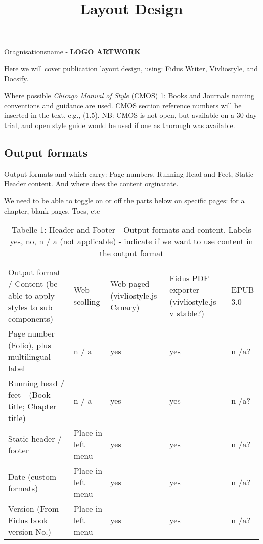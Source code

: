 \documentclass{article}
\begin{document}
\title{Layout Design}

\maketitle


Oragnisationsname - \textbf{LOGO ARTWORK}


Here we will cover publication layout design, using: Fidus Writer, Vivliostyle, and Docsify.


Where possible \emph{Chicago Manual of Style} (CMOS) \href{https://www.chicagomanualofstyle.org/16/ch01/ch01_toc.html}{1: Books and Journals} naming conventions and guidance are used. CMOS section reference numbers will be inserted in the text, e.g., (1.5). NB: CMOS is not open, but available on a 30 day trial, and open style guide would be used if one as thorough was available.


\subsection{Output formats}\label{H8118386}



Output formats and which carry: Page numbers, Running Head and Feet, Static Header content. And where does the content orginatate.


We need to be able to toggle on or off the parts below on specific pages: for a chapter, blank pages, Tocs, etc

\begin{table}
\caption*{Tabelle 1: Header and Footer - Output formats and content. Labels yes, no, n / a (not applicable) - indicate if we want to use content in the output format}\label{T63104901}

\begin{tabu} to \textwidth { |X|X|X|X|X| }
\hline



Output format / Content (be able to apply styles to sub components) & Web scolling  & Web paged (vivliostyle.js Canary) & Fidus PDF exporter (vivliostyle.js v stable?) & EPUB 3.0
 \\


Page number (Folio), plus multilingual label & n / a & yes & yes & n /a?
 \\


Running head / feet - (Book title; Chapter title) & n / a & yes & yes & n /a?
 \\


Static header / footer & Place in left menu & yes & yes & n /a?
 \\


Date (custom formats) & Place in left menu & yes & yes & n /a?
 \\


Version (From Fidus book version No.) & Place in left menu & yes & yes & n /a?
 \\
\hline

\end{tabu}\end{table}
\end{document}
